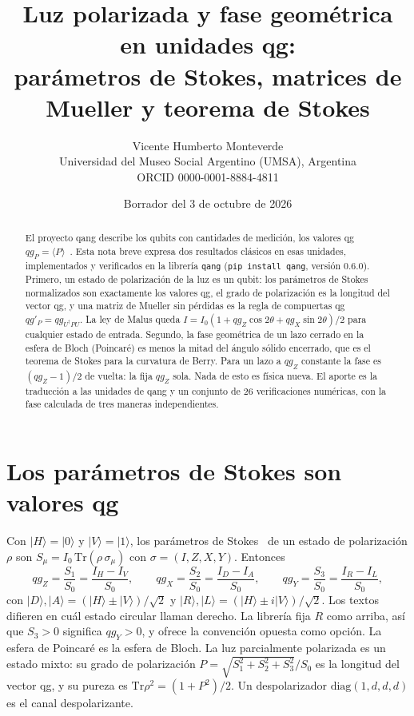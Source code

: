 \documentclass[11pt]{article}
\title{Luz polarizada y fase geométrica en unidades qg:\\
parámetros de Stokes, matrices de Mueller y teorema de Stokes}
\author{Vicente Humberto Monteverde\\
\small Universidad del Museo Social Argentino (UMSA), Argentina\\
\small ORCID 0000-0001-8884-4811}
\date{\small Borrador del 3 de octubre de 2026}
\begin{document}
\sloppy
\maketitle

\begin{abstract}
El proyecto qang describe los qubits con cantidades de medición, los valores qg
$qg_P=\langle P\rangle$~\cite{monteverde2026qang}. Esta nota breve expresa dos resultados clásicos en esas unidades,
implementados y verificados en la librería \texttt{qang} (\texttt{pip install qang}, versión 0.6.0). Primero,
un estado de polarización de la luz es un qubit: los parámetros de Stokes normalizados son exactamente los
valores qg, el grado de polarización es la longitud del vector qg, y una matriz de Mueller sin pérdidas es la
regla de compuertas qg $qg'_P=qg_{U^\dagger PU}$. La ley de Malus queda $I=I_0(1+qg_Z\cos2\theta+qg_X\sin2\theta)/2$
para cualquier estado de entrada. Segundo, la fase geométrica de un lazo cerrado en la esfera de Bloch
(Poincaré) es menos la mitad del ángulo sólido encerrado, que es el teorema de Stokes para la curvatura de
Berry. Para un lazo a $qg_Z$ constante la fase es $(qg_Z-1)/2$ de vuelta: la fija $qg_Z$ sola. Nada de esto es
física nueva. El aporte es la traducción a las unidades de qang y un conjunto de 26 verificaciones numéricas,
con la fase calculada de tres maneras independientes.
\end{abstract}

\section{Los parámetros de Stokes son valores qg}

Con $|H\rangle=|0\rangle$ y $|V\rangle=|1\rangle$, los parámetros de Stokes~\cite{stokes1852} de un estado de
polarización $\rho$ son $S_\mu=I_0\,\mathrm{Tr}(\rho\,\sigma_\mu)$ con $\sigma=(I,Z,X,Y)$. Entonces
\begin{equation}
qg_Z=\frac{S_1}{S_0}=\frac{I_H-I_V}{S_0},\qquad
qg_X=\frac{S_2}{S_0}=\frac{I_D-I_A}{S_0},\qquad
qg_Y=\frac{S_3}{S_0}=\frac{I_R-I_L}{S_0},
\end{equation}
con $|D\rangle,|A\rangle=(|H\rangle\pm|V\rangle)/\sqrt2$ y $|R\rangle,|L\rangle=(|H\rangle\pm i|V\rangle)/\sqrt2$.
Los textos difieren en cuál estado circular llaman derecho. La librería fija $R$ como arriba, así que $S_3>0$
significa $qg_Y>0$, y ofrece la convención opuesta como opción. La esfera de Poincaré es la esfera de Bloch. La
luz parcialmente polarizada es un estado mixto: su grado de polarización $P=\sqrt{S_1^2+S_2^2+S_3^2}/S_0$ es la
longitud del vector qg, y su pureza es $\mathrm{Tr}\rho^2=(1+P^2)/2$. Un despolarizador $\mathrm{diag}(1,d,d,d)$
es el canal despolarizante.
\end{document}
